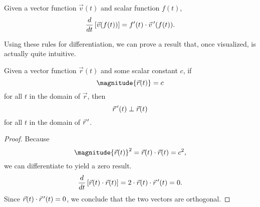 \begin{proposition}
    Given a vector function $\vec{v}(t)$ and scalar function $f(t)$,
    \[\frac{d}{dt}\left[\vec{v}(f(t))\right] = f^{\prime}(t)\cdot \vec{v}\,^{\prime}(f(t)).\]
\end{proposition}

Using these rules for differentiation, we can prove a result that, once visualized, is actually quite intuitive.

\begin{theorem}
    Given a vector function $\vec{r}(t)$ and some scalar constant $c$, if
    \[\magnitude{\vec{r}(t)} = c\]
    for all $t$ in the domain of $\vec{r}$, then
    \[\vec{r}\,^{\prime}(t) \perp \vec{r}(t)\]
    for all $t$ in the domain of $\vec{r}\,^{\prime}$.
\end{theorem}

\begin{proof}
    Because
    \[\magnitude{\vec{r}(t)}^{2} = \vec{r}(t) \cdot \vec{r}(t) = c^{2},\]
    we can differentiate to yield a zero result.
    \[\frac{d}{dt}\left[\vec{r}(t) \cdot \vec{r}(t)\right] = 2 \cdot \vec{r}(t) \cdot \vec{r}\,^{\prime}(t) = 0.\]
    Since $\vec{r}(t) \cdot \vec{r}\,^{\prime}(t) = 0$, we conclude that the two vectors are orthogonal.
\end{proof}